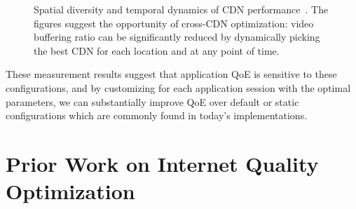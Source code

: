 \begin{figure}[t]
\centering
\captionsetup[subfigure]{justification=centering,farskip=-1pt,captionskip=5pt}
\caption{Spatial diversity and temporal dynamics of CDN 
performance~\cite{sigcomm12conviva}. 
The figures suggest the opportunity of cross-CDN optimization:
video buffering ratio can be significantly reduced by dynamically
picking the best CDN for each location and at any point of time.}
\label{fig:back-cross-cdn}
\end{figure}


These measurement results suggest that application QoE is 
sensitive to these configurations, and by customizing for 
each application session with the optimal parameters, 
we can substantially improve QoE over default or static 
configurations which are commonly found in today's 
implementations.


\section{Prior Work on Internet Quality Optimization}
\label{sec:related:quality}

